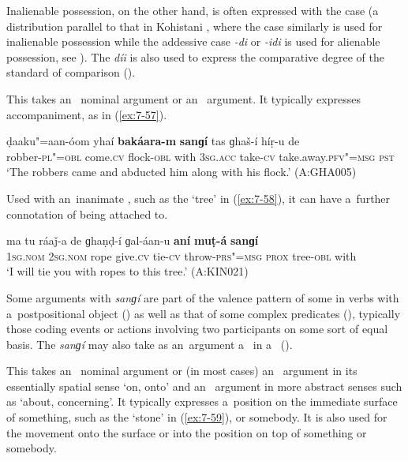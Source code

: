 Inalienable possession, on the other hand, is often expressed with the  case (a distribution parallel to that in Kohistani \iliShina, where the  case similarly is used for inalienable possession while the addessive case \textit{-di} or \textit{-idi} is used for alienable possession, see \citealt[65, 69--70]{schmidtkohistani2008}). The  \textit{díi} is also used to express the comparative degree of the standard of comparison ().


 This  takes an~ nominal argument or an~  argument. It typically expresses accompaniment, as in (\ref{ex:7-57}).

\ea
\label{ex:7-57}
\gll ḍaaku"=aan-óom yhaí \textbf{bakáara-m} \textbf{sanɡí} tas ɡhaš-í híṛ-u de \\
robber-\textsc{pl"=obl} come.\textsc{cv} flock-\textsc{obl}  with \textsc{3sg.acc} take-\textsc{cv} take.away.\textsc{pfv"=msg} \textsc{pst} \\
\glt `The robbers came and abducted him along with his flock.' (A:GHA005)
\z

Used with an~inanimate , such as the `tree' in (\ref{ex:7-58}), it can have a~further connotation of being attached to.

\begin{exe}
\ex
\label{ex:7-58}
\gll ma tu ráaǰ-a de ɡhaṇḍ-í ɡal-áan-u \textbf{aní} \textbf{muṭ-á} \textbf{sanɡí} \\
\textsc{1sg.nom} \textsc{2sg.nom} rope give.\textsc{cv} tie-\textsc{cv} throw-\textsc{prs"=msg} \textsc{prox} tree-\textsc{obl} with \\
\glt `I will tie you with ropes to this tree.' (A:KIN021)
\end{exe}

Some arguments with \textit{sanɡí} are part of the valence pattern of some in verbs with a~postpositional object () as well as that of some complex predicates (), typically those coding events or actions involving two participants on some sort of equal basis. The  \textit{sanɡí} may also take as an~argument a~ in a~  ().


 This  takes an~ nominal argument or (in most cases) an~  argument in its essentially spatial sense `on, onto' and an~  argument in more abstract senses such as `about, concerning'. It typically expresses a~position on the immediate surface of something, such as the `stone' in (\ref{ex:7-59}), or somebody. It is also used for the movement onto the surface or into the position on top of something or somebody.

